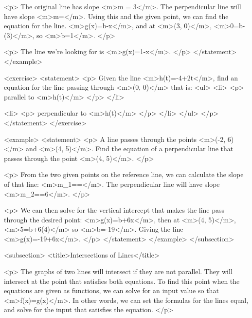                 <p>
                    The original line has slope <m>m = 3</m>.
                    The perpendicular line will have slope <m>m=</m>.
                    Using this and the given point, we can find the equation for the line.
                    <m>g(x)=b-x</m>, and at <m>(3, 0)</m>, <m>0=b-(3)</m>, so <m>b=1</m>.
                </p>

                <p>
                    The line we’re looking for is <m>g(x)=1-x</m>.
                </p>
            </statement>
        </example>

        <exercise>
            <statement>
                <p>
                    Given the line <m>h(t)=-4+2t</m>, find an equation for the line passing through <m>(0, 0)</m> that is:
                    <ul>
                        <li>
                            <p>
                                parallel to <m>h(t)</m>
                            </p>
                        </li>

                        <li>
                            <p>
                                perpendicular to <m>h(t)</m>
                            </p>
                        </li>
                    </ul>
                </p>
            </statement>
        </exercise>

        <example>
            <statement>
                <p>
                    A line passes through the points <m>(-2, 6)</m> and <m>(4, 5)</m>.
                    Find the equation of a perpendicular line that passes through the point <m>(4, 5)</m>.
                </p>

                <p>
                    From the two given points on the reference line, we can calculate the slope of that line: <m>m_{1}==</m>.
                    The perpendicular line will have slope <m>m_{2}==6</m>.
                </p>

                <p>
                    We can then solve for the vertical intercept that makes the line pass through the desired point: <m>g(x)=b+6x</m>, then at <m>(4, 5)</m>, <m>5=b+6(4)</m> so <m>b=-19</m>.
                    Giving the line <m>g(x)=-19+6x</m>.
                </p>
            </statement>
        </example>
    </subsection>


    <subsection>
        <title>Intersections of Lines</title>

        <p>
            The graphs of two lines will intersect if they are not parallel.
            They will intersect at the point that satisfies both equations.
            To find this point when the equations are given as functions, we can solve for an input value so that <m>f(x)=g(x)</m>.
            In other words, we can set the formulas for the lines equal, and solve for the input that satisfies the equation.
        </p>

